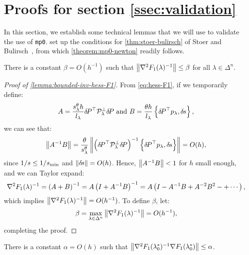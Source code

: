 \documentclass[eikonal.tex]{subfiles}
\begin{document}
\section{Proofs for section
  \ref{ssec:validation}}\label{app:validation-proofs} In this section, we establish some technical lemmas that we will use
to validate the use of
\texttt{mp0}. 
set up the conditions for \cref{thm:stoer-bulirsch} of Stoer and
Bulirsch~\cite{stoer2013introduction}, from which
\cref{theorem:mp0-newton} readily follows.

\begin{lemma}\label{lemma:bounded-inv-hess-F1}
  There is a constant $\beta = O(h^{-1})$ such that
  $\left\|\nabla^2 F_1(\lambda)^{-1}\right\| \leq \beta$ for all
  $\lambda \in \Delta^n$.
\end{lemma}

\begin{proof}[Proof of \cref{lemma:bounded-inv-hess-F1}]
  From \cref{eq:hess-F1}, if we temporarily define:
  \begin{equation}
    A = \frac{s^\theta_\lambda h}{l_\lambda} {\delta \hspace{-0.14em} P}^\top \mathcal{P}^\perp_\lambda {\delta \hspace{-0.14em} P} \mbox{ and } B = \frac{\theta h}{l_\lambda} \left\{{\delta \hspace{-0.14em} P}^\top p_\lambda, {\delta \hspace{-0.1em} s}\right\},
  \end{equation}
  we can see that:
  \begin{equation}
    \left\|A^{-1} B\right\| = \frac{\theta}{s^\theta_\lambda} \left\|\left({\delta \hspace{-0.14em} P}^\top \mathcal{P}^\perp_\lambda {\delta \hspace{-0.14em} P}\right)^{-1} \left\{{\delta \hspace{-0.14em} P}^\top p_\lambda, {\delta \hspace{-0.1em} s}\right\}\right\| = O(h),
  \end{equation}
  since $1/s \leq 1/s_{\operatorname{min}}$ and $\left\|{\delta \hspace{-0.1em} s}\right\| = O(h)$. Hence,
  $\left\|A^{-1} B\right\| < 1$ for $h$ small enough, and we can Taylor
  expand:
  \begin{equation}
    \nabla^2 F_1(\lambda)^{-1} = \left(A + B\right)^{-1} = A \left(I + A^{-1}B\right)^{-1} = A \left(I - A^{-1} B + A^{-2} B^2 - + \cdots\right),
  \end{equation}
  which implies $\left\|\nabla^2 F_1(\lambda)^{-1}\right\| = O(h^{-1})$. To
  define $\beta$, let:
  \begin{equation}
    \beta = \max_{\lambda \in \Delta^n} \left\|\nabla^2 F_1(\lambda)^{-1}\right\| = O(h^{-1}),
  \end{equation}
  completing the proof.
\end{proof}

\begin{lemma}\label{lemma:bounded-first-step}
  There is a constant $\alpha = O(h)$ such that
  $\left\|\nabla^2 F_1(\lambda_{0}^*)^{-1} \nabla F_1(\lambda_{0}^*)\right\|
  \leq \alpha$.
\end{lemma}
\end{document}
